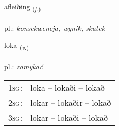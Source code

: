 \documentclass[frontgrid, backgrid]{flacards}\usepackage[]{graphicx}\usepackage[]{xcolor}
\begin{document}
\renewcommand{\flhead}{\vskip5pt \fboxsep=0pt {\small\bfseries\footnotesize Nafnorð | Noun}}
\renewcommand{\fcfoot}{\vskip5pt \fboxsep=0pt \hspace{2pt}{\small\bfseries\footnotesize 1K}}

\renewcommand{\blhead}{\vskip5pt {\small\bfseries\footnotesize Nafnorð | Noun }}
\renewcommand{\bcfoot}{\vskip5pt \hspace{2pt}{\small\bfseries\footnotesize 1K}}


{afleiðing \small{\textsubscript{(\textit{f.})}} \\[1ex] %
\textphonetic{[avleiðiŋk]} \\
pl.: \emph{konsekwencja, wynik, skutek} \\  [2ex]
\renewcommand*{\arraystretch}{0.8}
}

\renewcommand{\flhead}{\vskip5pt \fboxsep=0pt {\small\bfseries\footnotesize Sagnorð | Verb}}
\renewcommand{\fcfoot}{\vskip5pt \fboxsep=0pt \hspace{2pt}{\small\bfseries\footnotesize 1K}}

\renewcommand{\blhead}{\vskip5pt {\small\bfseries\footnotesize Sagnorð | Verb }}
\renewcommand{\bcfoot}{\vskip5pt \hspace{2pt}{\small\bfseries\footnotesize 1K}}


{loka \small{\textsubscript{(\textit{v.})}} \\[1ex] %
\textphonetic{[lɔːka]} \\
pl.: \emph{zamykać} \\  [2ex]
\renewcommand*{\arraystretch}{0.8}
\begin{tabular}{p{1cm}l}
\textsc{1sg}: & loka -- lokaði -- lokað \\ 
\textsc{2sg}: & lokar -- lokaðir -- lokað \\ 
\textsc{3sg}: & lokar -- lokaði -- lokað \\ 
\end{tabular}
}
\end{document}
